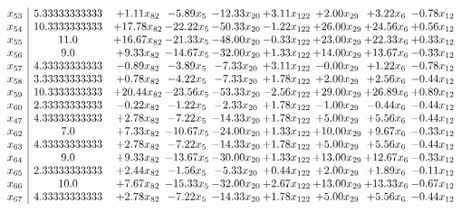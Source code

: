\documentclass[8pt]{article}
\begin{document}
\[\begin{array}{c| c c@{\hskip 2pt} c@{\hskip 2pt} c@{\hskip 2pt} c@{\hskip 2pt} c@{\hskip 2pt} c@{\hskip 2pt} c@{\hskip 2pt} }
 x_{53}   &  5.33333333333 & +  1.11 x_{82} & -5.89 x_{5} & -12.33 x_{20} & +  3.11 x_{122} & +  2.00 x_{29} & +  3.22 x_{6} & -0.78 x_{12}\\
 x_{54}   &  10.3333333333 & + 17.78 x_{82} & -22.22 x_{5} & -50.33 x_{20} & -1.22 x_{122} & + 26.00 x_{29} & + 24.56 x_{6} & +  0.56 x_{12}\\
 x_{55}   &  11.0 & + 16.67 x_{82} & -21.33 x_{5} & -48.00 x_{20} & -0.33 x_{122} & + 23.00 x_{29} & + 22.33 x_{6} & +  0.33 x_{12}\\
 x_{56}   &  9.0 & +  9.33 x_{82} & -14.67 x_{5} & -32.00 x_{20} & +  1.33 x_{122} & + 14.00 x_{29} & + 13.67 x_{6} & -0.33 x_{12}\\
 x_{57}   &  4.33333333333 & -0.89 x_{82} & -3.89 x_{5} & -7.33 x_{20} & +  3.11 x_{122} & -0.00 x_{29} & +  1.22 x_{6} & -0.78 x_{12}\\
 x_{58}   &  3.33333333333 & +  0.78 x_{82} & -4.22 x_{5} & -7.33 x_{20} & +  1.78 x_{122} & +  2.00 x_{29} & +  2.56 x_{6} & -0.44 x_{12}\\
 x_{59}   &  10.3333333333 & + 20.44 x_{82} & -23.56 x_{5} & -53.33 x_{20} & -2.56 x_{122} & + 29.00 x_{29} & + 26.89 x_{6} & +  0.89 x_{12}\\
 x_{60}   &  2.33333333333 & -0.22 x_{82} & -1.22 x_{5} & -2.33 x_{20} & +  1.78 x_{122} & -1.00 x_{29} & -0.44 x_{6} & -0.44 x_{12}\\
 x_{47}   &  4.33333333333 & +  2.78 x_{82} & -7.22 x_{5} & -14.33 x_{20} & +  1.78 x_{122} & +  5.00 x_{29} & +  5.56 x_{6} & -0.44 x_{12}\\
 x_{62}   &  7.0 & +  7.33 x_{82} & -10.67 x_{5} & -24.00 x_{20} & +  1.33 x_{122} & + 10.00 x_{29} & +  9.67 x_{6} & -0.33 x_{12}\\
 x_{63}   &  4.33333333333 & +  2.78 x_{82} & -7.22 x_{5} & -14.33 x_{20} & +  1.78 x_{122} & +  5.00 x_{29} & +  5.56 x_{6} & -0.44 x_{12}\\
 x_{64}   &  9.0 & +  9.33 x_{82} & -13.67 x_{5} & -30.00 x_{20} & +  1.33 x_{122} & + 13.00 x_{29} & + 12.67 x_{6} & -0.33 x_{12}\\
 x_{65}   &  2.33333333333 & +  2.44 x_{82} & -1.56 x_{5} & -5.33 x_{20} & +  0.44 x_{122} & +  2.00 x_{29} & +  1.89 x_{6} & -0.11 x_{12}\\
 x_{66}   &  10.0 & +  7.67 x_{82} & -15.33 x_{5} & -32.00 x_{20} & +  2.67 x_{122} & + 13.00 x_{29} & + 13.33 x_{6} & -0.67 x_{12}\\
 x_{67}   &  4.33333333333 & +  2.78 x_{82} & -7.22 x_{5} & -14.33 x_{20} & +  1.78 x_{122} & +  5.00 x_{29} & +  5.56 x_{6} & -0.44 x_{12}\\

\end{array}\]
\end{document}
